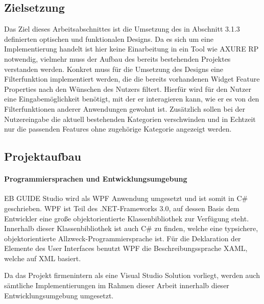 \subsection {Zielsetzung}
Das Ziel dieses Arbeitsabschnittes ist die Umsetzung des in Abschnitt 3.1.3 definierten optischen und funktionalen Designs.
Da es sich um eine Implementierung handelt ist hier keine Einarbeitung in ein Tool wie AXURE RP notwendig, vielmehr muss der Aufbau des bereits bestehenden Projektes verstanden werden.
Konkret muss für die Umsetzung des Designs eine Filterfunktion implementiert werden, die die bereits vorhandenen Widget Feature Properties nach den Wünschen des Nutzers filtert.
Hierfür wird für den Nutzer eine Eingabemöglichkeit benötigt, mit der er interagieren kann, wie er es von den Filterfunktionen anderer Anwendungen gewohnt ist.
Zusätzlich sollen bei der Nutzereingabe die aktuell bestehenden Kategorien verschwinden und in Echtzeit nur die passenden Features ohne zugehörige Kategorie angezeigt werden.

\subsection {Projektaufbau}

\paragraph{Programmiersprachen und Entwicklungsumgebung}
EB GUIDE Studio wird als WPF Anwendung umgesetzt und ist somit in C\# geschrieben.
WPF ist Teil des .NET-Frameworks 3.0, auf dessen Basis dem Entwickler eine große objektorientierte Klassenbibliothek zur Verfügung steht.
Innerhalb dieser Klassenbibliothek ist auch C\# zu finden, welche eine typsichere, objektorientierte Allzweck-Programmiersprache ist.
Für die Deklaration der Elemente des User Interfaces benutzt WPF die Beschreibungssprache XAML, welche auf XML basiert.

Da das Projekt firmenintern als eine Visual Studio Solution vorliegt, werden auch sämtliche Implementierungen im Rahmen dieser Arbeit innerhalb dieser Entwicklungsumgebung umgesetzt.


